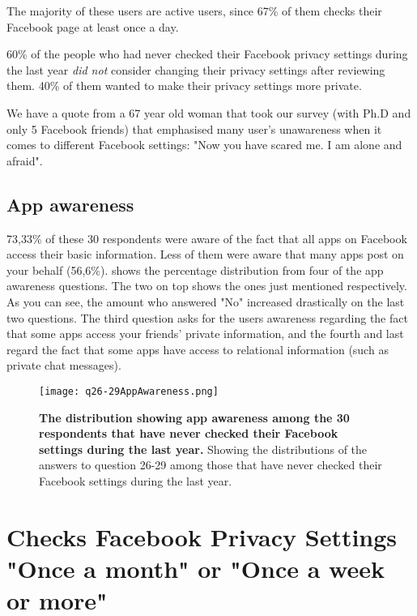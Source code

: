 The majority of these users are active users, since 67\% of them checks their Facebook page at least once a day. 

60\% of the people who had never checked their Facebook privacy settings during the last year \textit{did not} consider changing their privacy settings after reviewing them. 40\% of them wanted to make their privacy settings more private. 

We have a quote from a 67 year old woman that took our survey (with Ph.D and only 5 Facebook friends) that emphasised many user's unawareness when it comes to different Facebook settings: "Now you have scared me. I am alone and afraid".

\subsection{App awareness}
73,33\% of these 30 respondents were aware of the fact that all apps on Facebook access their basic information. Less of them were aware that many apps post on your behalf (56,6\%).  shows the percentage distribution from four of the app awareness questions. The two on top shows the ones just mentioned respectively. As you can see, the amount who answered "No" increased drastically on the last two questions. The third question asks for the users awareness regarding the fact that some apps access your friends' private information, and the fourth and last regard the fact that some apps have access to relational information (such as private chat messages). 

\begin{figure}[h!]
\centering
\texttt{[image: q26-29AppAwareness.png]}
\caption[The distribution showing app awareness among the 30 respondents that have never checked their Facebook settings during the last year]{\textbf{The distribution showing app awareness among the 30 respondents that have never checked their Facebook settings during the last year.} Showing the distributions of the answers to question 26-29 among those that have never checked their Facebook settings during the last year.} 
\label{fig:appawarenessneverchecked}
\end{figure}


\section{Checks Facebook Privacy Settings "Once a month" or "Once a week or more"}

